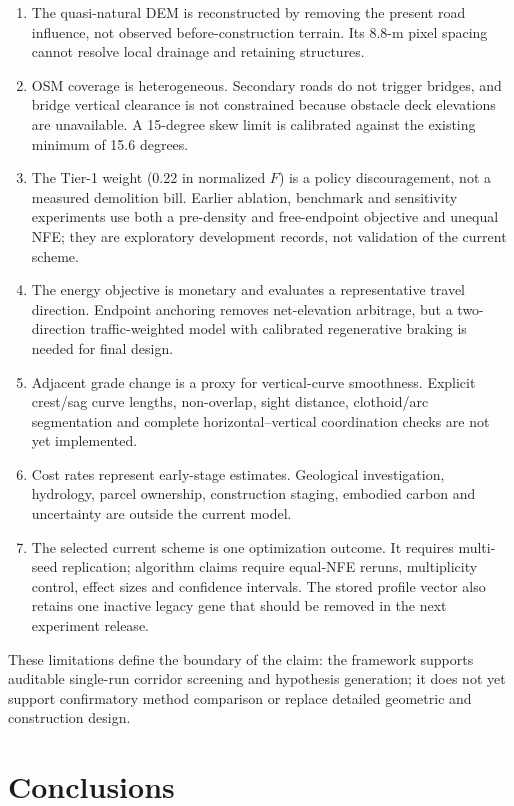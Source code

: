 \documentclass[preprint,12pt]{elsarticle}
\begin{document}
\begin{enumerate}[leftmargin=*,label=(\arabic*)]
\item The quasi-natural DEM is reconstructed by removing the present road influence, not observed before-construction terrain. Its 8.8-m pixel spacing cannot resolve local drainage and retaining structures.
\item OSM coverage is heterogeneous. Secondary roads do not trigger bridges, and bridge vertical clearance is not constrained because obstacle deck elevations are unavailable. A 15-degree skew limit is calibrated against the existing minimum of 15.6 degrees.
\item The Tier-1 weight (0.22 in normalized $F$) is a policy discouragement, not a measured demolition bill. Earlier ablation, benchmark and sensitivity experiments use both a pre-density and free-endpoint objective and unequal NFE; they are exploratory development records, not validation of the current scheme.
\item The energy objective is monetary and evaluates a representative travel direction. Endpoint anchoring removes net-elevation arbitrage, but a two-direction traffic-weighted model with calibrated regenerative braking is needed for final design.
\item Adjacent grade change is a proxy for vertical-curve smoothness. Explicit crest/sag curve lengths, non-overlap, sight distance, clothoid/arc segmentation and complete horizontal--vertical coordination checks are not yet implemented.
\item Cost rates represent early-stage estimates. Geological investigation, hydrology, parcel ownership, construction staging, embodied carbon and uncertainty are outside the current model.
\item The selected current scheme is one optimization outcome. It requires multi-seed replication; algorithm claims require equal-NFE reruns, multiplicity control, effect sizes and confidence intervals. The stored profile vector also retains one inactive legacy gene that should be removed in the next experiment release.
\end{enumerate}

These limitations define the boundary of the claim: the framework supports auditable single-run corridor screening and hypothesis generation; it does not yet support confirmatory method comparison or replace detailed geometric and construction design.

\section{Conclusions}
\end{document}
